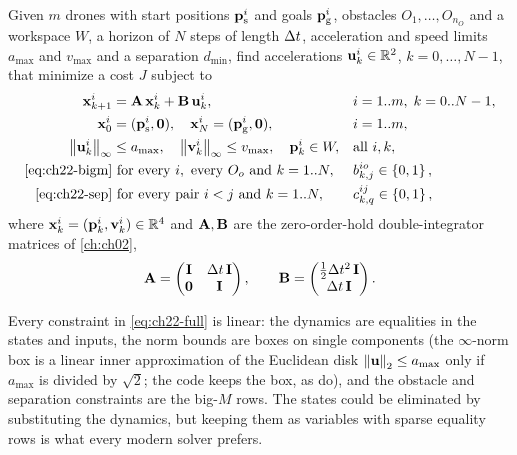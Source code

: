 \begin{definition}
\label{def:ch22-problem}
Given $m$ drones with start positions $\mathbf{p}^i_{\mathrm{s}}$ and goals
$\mathbf{p}^i_{\mathrm{g}}$, obstacles $O_1, \dots, O_{n_O}$ and a workspace $W$,
a horizon of $N$ steps of length $\Delta t$, acceleration and speed limits
$a_{\max}$ and $v_{\max}$ and a separation $d_{\min}$, find accelerations
$\mathbf{u}^i_k \in \mathbb{R}^2$, $k = 0, \dots, N-1$, that minimize a cost $J$ subject to
\begin{subequations}
\label{eq:ch22-full}
\begin{align}
  \state^i_{k+1} &= \mat{A}\,\state^i_k + \mat{B}\,\ctrl^i_k,
    & &i = 1..m,\; k = 0..N-1, \label{eq:ch22-full-dyn}\\
  \state^i_0 &= (\pos^i_{\mathrm{s}}, \vect{0}), \quad
  \state^i_N = (\pos^i_{\mathrm{g}}, \vect{0}), & &i = 1..m, \label{eq:ch22-full-bc}\\
  \norm{\ctrl^i_k}_\infty &\le a_{\max}, \quad \norm{\vel^i_k}_\infty \le v_{\max},
  \quad \pos^i_k \in W, & &\text{all } i, k, \label{eq:ch22-full-bounds}\\
  \text{\cref{eq:ch22-bigm}} &\text{ for every } i, \text{ every } O_o
  \text{ and } k = 1..N, & &b^{io}_{k,j} \in \set{0,1}, \label{eq:ch22-full-obs}\\
  \text{\cref{eq:ch22-sep}} &\text{ for every pair } i < j \text{ and } k = 1..N,
  & &c^{ij}_{k,q} \in \set{0,1}, \label{eq:ch22-full-sep}
\end{align}
\end{subequations}
where $\mathbf{x}^i_k = (\mathbf{p}^i_k, \mathbf{v}^i_k) \in \mathbb{R}^4$ and $\mathbf{A}, \mathbf{B}$
are the zero-order-hold double-integrator matrices of \cref{ch:ch02},
\[
  \mathbf{A} = \begin{pmatrix} \mathbf{I} & \Delta t\,\mathbf{I}\\ \mathbf{0} & \mathbf{I}\end{pmatrix},
  \qquad
  \mathbf{B} = \begin{pmatrix} \tfrac12 \Delta t^2\,\mathbf{I}\\ \Delta t\,\mathbf{I}\end{pmatrix}.
\]
\end{definition}

Every constraint in \cref{eq:ch22-full} is linear: the dynamics are
equalities in the states and inputs, the norm bounds are boxes on single
components (the $\infty$-norm box is a linear inner approximation of the
Euclidean disk $\left\lVert \mathbf{u} \right\rVert_2 \le a_{\max}$ only if $a_{\max}$ is divided by
$\sqrt2$; the code keeps the box, as \textcite{richards2002aircraft} do), and
the obstacle and separation constraints are the big-$M$ rows. The states
could be eliminated by substituting the dynamics, but keeping them as
variables with sparse equality rows is what every modern solver prefers.

